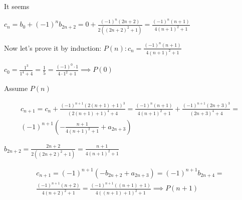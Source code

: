 \documentclass{article}
\begin{document}
It seems

\( c_{n} = b_{0} + {(-1)}^{n}b_{2n+2} = 0 + \frac{{(-1)}^{n}(2n+2)}{2({(2n+2)}^{2}+1)} = \frac{{(-1)}^{n}(n+1)}{4{(n+1)}^{2}+1} \)

Now let's prove it by induction: \( P(n): c_{n} = \frac{{(-1)}^{n}(n+1)}{4{(n+1)}^{2}+1} \)

\( c_{0} = \frac{1^{3}}{1^{4}+4} = \frac{1}{5} = \frac{{(-1)}^{0}\cdot 1}{4\cdot 1^{2}+1} \implies P(0) \)

Assume \( P(n) \)

\begin{multline*}
c_{n+1} = c_{n} + \frac{{(-1)}^{n+1}{(2(n+1)+1)}^{3}}{{(2(n+1)+1)}^{4}+4} = \frac{{(-1)}^{n}(n+1)}{4{(n+1)}^{2}+1} + \frac{{(-1)}^{n+1}{(2n+3)}^{3}}{{(2n+3)}^{4}+4} = \\
{(-1)}^{n+1} (-\frac{n+1}{4{(n+1)}^{2}+1} + a_{2n+3})
\end{multline*}

\( b_{2n+2} = \frac{2n+2}{2({(2n+2)}^{2}+1)} = \frac{n+1}{4{(n+1)}^{2}+1} \)

\begin{multline*}
c_{n+1} = {(-1)}^{n+1}(-b_{2n+2} + a_{2n+3}) = {(-1)}^{n+1} b_{2n+4} = \\
\frac{{(-1)}^{n+1}(n+2)}{4{(n+2)}^{2}+1} = \frac{{(-1)}^{n+1}((n+1)+1)}{4{((n+1)+1)}^{2}+1} \implies P(n+1)
\end{multline*}
\end{document}
